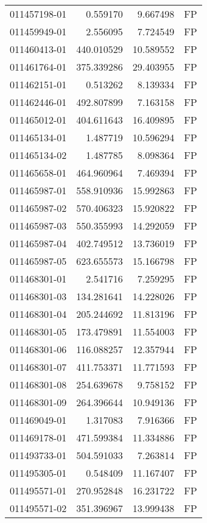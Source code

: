 \begin{tabular}{lrrl}
011457198-01 &    0.559170 &     9.667498 &   FP \\
011459949-01 &    2.556095 &     7.724549 &   FP \\
011460413-01 &  440.010529 &    10.589552 &   FP \\
011461764-01 &  375.339286 &    29.403955 &   FP \\
011462151-01 &    0.513262 &     8.139334 &   FP \\
011462446-01 &  492.807899 &     7.163158 &   FP \\
011465012-01 &  404.611643 &    16.409895 &   FP \\
011465134-01 &    1.487719 &    10.596294 &   FP \\
011465134-02 &    1.487785 &     8.098364 &   FP \\
011465658-01 &  464.960964 &     7.469394 &   FP \\
011465987-01 &  558.910936 &    15.992863 &   FP \\
011465987-02 &  570.406323 &    15.920822 &   FP \\
011465987-03 &  550.355993 &    14.292059 &   FP \\
011465987-04 &  402.749512 &    13.736019 &   FP \\
011465987-05 &  623.655573 &    15.166798 &   FP \\
011468301-01 &    2.541716 &     7.259295 &   FP \\
011468301-03 &  134.281641 &    14.228026 &   FP \\
011468301-04 &  205.244692 &    11.813196 &   FP \\
011468301-05 &  173.479891 &    11.554003 &   FP \\
011468301-06 &  116.088257 &    12.357944 &   FP \\
011468301-07 &  411.753371 &    11.771593 &   FP \\
011468301-08 &  254.639678 &     9.758152 &   FP \\
011468301-09 &  264.396644 &    10.949136 &   FP \\
011469049-01 &    1.317083 &     7.916366 &   FP \\
011469178-01 &  471.599384 &    11.334886 &   FP \\
011493733-01 &  504.591033 &     7.263814 &   FP \\
011495305-01 &    0.548409 &    11.167407 &   FP \\
011495571-01 &  270.952848 &    16.231722 &   FP \\
011495571-02 &  351.396967 &    13.999438 &   FP \\

\end{tabular}

